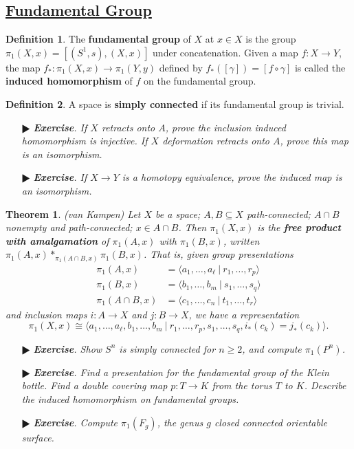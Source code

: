 \documentclass[11pt]{amsart}
\newtheorem*{theorem*}{Theorem}
\theoremstyle{definition}
\newtheorem*{definition*}{Definition}
\renewcommand\geq{\geqslant}
\renewcommand\:{\colon}
\newcommand{\1}{\mathds{1}}
\newcommand{\exc}[1]{\vspace{-2.5pt}\begin{itemize}[leftmargin=15pt]\item[$\RHD$] \textit{\textbf{Exercise}. #1}\end{itemize}}
\begin{document}
\subsection*{\underline{Fundamental Group}}

\begin{definition*}
	The \textbf{fundamental group} of $X$ at $x \in X$ is the group $\pi_1(X, x) = [(S^1,s), (X,x)]$ under concatenation. Given a map $f\: X \to Y$, the map $f_*\: \pi_1(X,x) \to \pi_1(Y,y)$  defined by $f_*([\gamma]) = [f \circ \gamma]$ is called the \textbf{induced homomorphism} of $f$ on the fundamental group.
\end{definition*}

\begin{definition*}
	A space is \textbf{simply connected} if its fundamental group is trivial.
\end{definition*}

\exc{If $X$ retracts onto $A$, prove the inclusion induced homomorphism is injective. If $X$ deformation retracts onto $A$, prove this map is an isomorphism.}
\exc{If $X \to Y$ is a homotopy equivalence, prove the induced map is an isomorphism.}

\begin{theorem*}
	\textnormal{(van Kampen)} Let $X$ be a space; $A, B \subseteq X$ path-connected; $A \cap B$ nonempty and path-connected; $x \in A \cap B$. Then $\pi_1(X, x)$ is the \textbf{free product with amalgamation} of $\pi_1(A, x)$ with $\pi_1(B, x)$, written $\pi_1(A, x) *_{\pi_1(A \cap B, x)} \pi_1(B, x)$. That is, given group presentations
	\begin{align*}
		\pi_1(A, x) &= \langle a_1, \dots, a_\ell \ | \ r_1, \dots, r_p\rangle \\
		\pi_1(B, x) &= \langle b_1, \dots, b_m \ | \ s_1, \dots, s_q \rangle \\
		\pi_1(A \cap B, x) &= \langle c_1, \dots, c_n \ | \ t_1, \dots, t_r \rangle 
	\end{align*}
	and inclusion maps $i\: A \to X$ and $j\: B \to X$, we have a representation
	\[ \pi_1(X, x) \cong \langle a_1, \dots, a_\ell, b_1, \dots, b_m \ | \ r_1, \dots, r_p, s_1, \dots, s_q, i_*(c_k) = j_*(c_k) \rangle. \]
\end{theorem*}

\exc{Show $S^n$ is simply connected for $n \geq 2$, and compute $\pi_1(P^n)$.}
\exc{Find a presentation for the fundamental group of the Klein bottle. Find a double covering map $p\: T \to K$ from the torus $T$ to $K$. Describe the induced homomorphism on fundamental groups.}
\exc{Compute $\pi_1(F_g)$, the genus $g$ closed connected orientable surface.}
\end{document}
